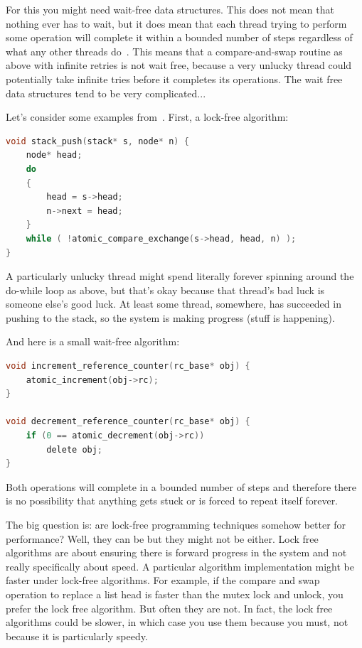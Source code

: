 \documentclass[a4paper]{report}
\begin{document}
For this you might need wait-free data structures. This does not mean that nothing ever has to wait, but it does mean that each thread trying to perform some operation will complete it within a bounded number of steps regardless of what any other threads do~\cite{nblfwf}. This means that a compare-and-swap routine as above with infinite retries is not wait free, because a very unlucky thread could potentially take infinite tries before it completes its operations. The wait free data structures tend to be very complicated...

Let's consider some examples from~\cite{1024cores}. First, a lock-free algorithm:

\begin{lstlisting}[language=C]
void stack_push(stack* s, node* n) {
    node* head;
    do
    {
        head = s->head;
        n->next = head;
    }
    while ( !atomic_compare_exchange(s->head, head, n) );
} 
\end{lstlisting}

A particularly unlucky thread might spend literally forever spinning around the do-while loop as above, but that's okay because that thread's bad luck is someone else's good luck. At least some thread, somewhere, has succeeded in pushing to the stack, so the system is making progress (stuff is happening). 

And here is a small wait-free algorithm:

\begin{lstlisting}[language=C]
void increment_reference_counter(rc_base* obj) {
    atomic_increment(obj->rc);
}

void decrement_reference_counter(rc_base* obj) {
    if (0 == atomic_decrement(obj->rc))
        delete obj;
} 
\end{lstlisting}

Both operations will complete in a bounded number of steps and therefore there is no possibility that anything gets stuck or is forced to repeat itself forever. 

The big question is: are lock-free programming techniques somehow better for performance? Well, they can be but they might not be either. Lock free algorithms are about ensuring there is forward progress in the system and not really specifically about speed. A particular algorithm implementation might be faster under lock-free algorithms. For example, if the compare and swap operation to replace a list head is faster than the mutex lock and unlock, you prefer the lock free algorithm. But often they are not. In fact, the lock free algorithms could be slower, in which case you use them because you must, not because it is particularly speedy.
\end{document}
